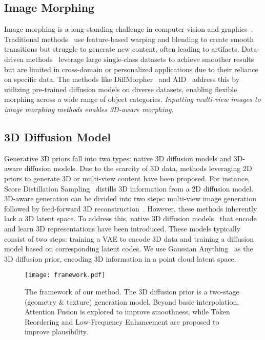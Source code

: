 \vspace{-0.4cm}
\subsection{Image Morphing}

Image morphing is a long-standing challenge in computer vision and graphics~\cite{aloraibi2023image, wolberg1998image, zope2017survey}. Traditional methods~\cite{beier2023feature, bhatt2011comparative, darabi2012image, liao2014automating, shechtman2010regenerative} use feature-based warping and blending to create smooth transitions but struggle to generate new content, often leading to artifacts. Data-driven methods~\cite{averbuch2016smooth, fish2020image} leverage large single-class datasets to achieve smoother results but are limited in cross-domain or personalized applications due to their reliance on specific data. The methods like DiffMorpher~\cite{zhang2024diffmorpher} and AID~\cite{he2024aid} address this by utilizing pre-trained diffusion models on diverse datasets, enabling flexible morphing across a wide range of object categories. \textit{Inputting multi-view images to image morphing methods enables 3D-aware morphing.}

\vspace{-0.4cm}
\subsection{3D Diffusion Model}

Generative 3D priors fall into two types: native 3D diffusion models and 3D-aware diffusion models. Due to the scarcity of 3D data, methods leveraging 2D priors to generate 3D or multi-view content have been proposed. For instance, Score Distillation Sampling~\cite{poole2022dreamfusion} distills 3D information from a 2D diffusion model. 3D-aware generation can be divided into two steps: multi-view image generation~\cite{shi2023mvdream} followed by feed-forward 3D reconstruction~\cite{xu2024instantmesh}. However, these methods inherently lack a 3D latent space. To address this, native 3D diffusion models~\cite{zhang20233dshape2vecset,vahdat2022lion,lan2025ln3diff} that encode and learn 3D representations have been introduced. These models typically consist of two steps: training a VAE to encode 3D data and training a diffusion model based on corresponding latent codes. We use Gaussian Anything~\cite{lan2024gaussiananything} as the 3D diffusion prior, encoding 3D information in a point cloud latent space.

\begin{figure*}[t]
    \centering
    \texttt{[image: framework.pdf]}
    \vspace{-0.6cm}
    \caption{The framework of our method. The 3D diffusion prior is a two-stage (geometry \& texture) generation model. Beyond basic interpolation, Attention Fusion  is explored to improve smoothness, while Token Reordering  and Low-Frequency Enhancement are proposed to improve plausibility.}
    \label{fig: framework}
    \vspace{-0.1cm}
\end{figure*}